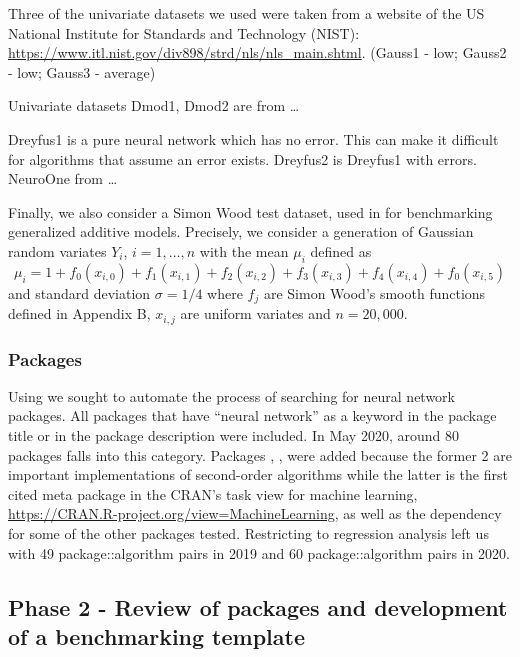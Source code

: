 Three of the univariate datasets we used were taken from a website of
the US National Institute for Standards and Technology (NIST):
\url{https://www.itl.nist.gov/div898/strd/nls/nls_main.shtml}. (Gauss1 -
low; Gauss2 - low; Gauss3 - average)

Univariate datasets Dmod1, Dmod2 are from \ldots{}

Dreyfus1 is a pure neural network which has no error. This can make it
difficult for algorithms that assume an error exists. Dreyfus2 is
Dreyfus1 with errors. NeuroOne from \ldots{}

Finally, we also consider a Simon Wood test dataset, used in
\citep{wood2011fast} for benchmarking generalized additive models.
Precisely, we consider a generation of Gaussian random variates \(Y_i\),
\(i=1,\dots,n\) with the mean \(\mu_i\) defined as \[
\mu_i = 1+ f_0(x_{i,0})+f_1(x_{i,1})+f_2(x_{i,2})+f_3(x_{i,3})
+f_4(x_{i,4})+f_0(x_{i,5})
\] and standard deviation \(\sigma=1/4\) where \(f_j\) are Simon Wood's
smooth functions defined in Appendix B, \(x_{i,j}\) are uniform variates
and \(n=20,000\).

\hypertarget{packages}{%
\subsubsection{Packages}\label{packages}}

Using  \citep{R-RWsearch} we sought to automate the
process of searching for neural network packages. All packages that have
``neural network'' as a keyword in the package title or in the package
description were included. In May 2020, around 80 packages falls into
this category. Packages , ,  were
added because the former 2 are important implementations of second-order
algorithms while the latter is the first cited meta package in the
CRAN's task view for machine learning,
\url{https://CRAN.R-project.org/view=MachineLearning}, as well as the
dependency for some of the other packages tested. Restricting to
regression analysis left us with 49 package::algorithm pairs in 2019 and
60 package::algorithm pairs in 2020.

\hypertarget{phase-2---review-of-packages-and-development-of-a-benchmarking-template}{%
\subsection{Phase 2 - Review of packages and development of a
benchmarking
template}\label{phase-2---review-of-packages-and-development-of-a-benchmarking-template}}

